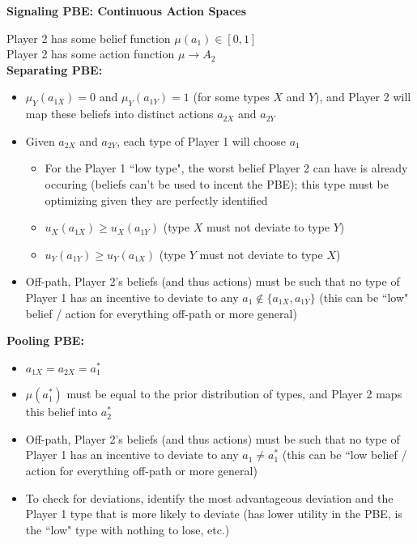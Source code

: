 \documentclass{report}
\newcommand{\FlowerSmall}{\mbox{\raisebox{-1pt}{\small\EightFlowerPetalRemoved}}} %
\begin{document}
\newpage
\begin{mdframed}
	\medskip
	\begin{center} \textbf{{\large Signaling PBE: Continuous Action Spaces}} \end{center}
	\bigskip
	
	Player 2 has some belief function $\mu(a_1) \in [0,1]$\\[5pt]
	Player 2 has some action function $\mu \rightarrow A_2$\\[5pt]
	\textbf{Separating PBE:}
	\begin{itemize}[label=\FlowerSmall]
		\item $\mu_Y(a_{1X}) = 0$ and $\mu_Y(a_{1Y})=1$ (for some types $X$ and $Y$), and Player 2 will map these beliefs into distinct actions $a_{2X}$ and $a_{2Y}$
		\item Given $a_{2X}$ and $a_{2Y}$, each type of Player 1 will choose $a_1$
			\begin{itemize}
				\item For the Player 1 ``low type", the worst belief Player 2 can have is already occuring (beliefs can't be used to incent the PBE); this type must be optimizing given they are perfectly identified
				\item $u_X(a_{1X}) \geq u_X(a_{1Y})$ (type $X$ must not deviate to type $Y$)
				\item $u_Y(a_{1Y}) \geq u_Y(a_{1X})$ (type $Y$ must not deviate to type $X$)
			\end{itemize}
	\item Off-path, Player 2's beliefs (and thus actions) must be such that no type of Player 1 has an incentive to deviate to any $a_1 \notin \{ a_{1X},a_{1Y} \}$ (this can be ``low" belief / action for everything off-path or more general)
	\end{itemize}
	\textbf{Pooling PBE:}
	\begin{itemize}[label=\FlowerSmall]
		\item $a_{1X} = a_{2X} = a_1^*$
		\item $\mu(a_1^*)$ must be equal to the prior distribution of types, and Player 2 maps this belief into $a_2^*$
		\item Off-path, Player 2's beliefs (and thus actions) must be such that no type of Player 1 has an incentive to deviate to any $a_1 \neq a_1^*$ (this can be ``low belief / action for everything off-path or more general)
		\item To check for deviations, identify the most advantageous deviation and the Player 1 type that is more likely to deviate (has lower utility in the PBE, is the ``low" type with nothing to lose, etc.)

\end{itemize}
\end{mdframed}
\end{document}
